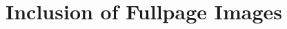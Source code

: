 \documentclass{scrartcl}
\begin{document}
\section{Inclusion of Fullpage Images}

\Blindtext[2]


\end{document}
